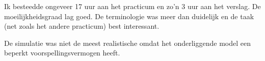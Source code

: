 
Ik besteedde ongeveer 17 uur aan het practicum en zo'n 3 uur aan het verslag. De moeilijkheidsgraad lag goed. De terminologie was meer dan duidelijk en de taak (net zoals het andere practicum) best interessant. 

\par\noindent De simulatie was niet de meest realistische omdat het onderliggende model een beperkt voorspellingsvermogen heeft.